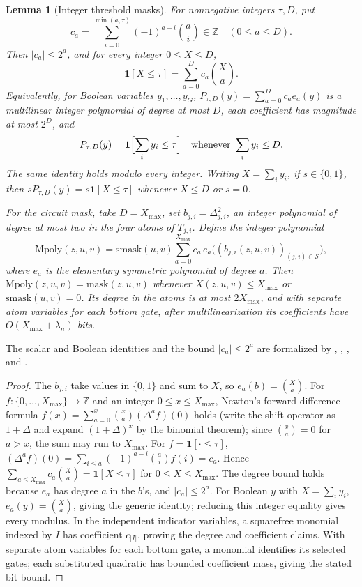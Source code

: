 \documentclass[11pt,letterpaper]{article}
\newtheorem{lemma}[theorem]{Lemma}
\theoremstyle{definition}
\theoremstyle{remark}
\newcommand{\Z}{\mathbb Z}
\newcommand{\smask}{\mathrm{smask}}
\newcommand{\mask}{\mathrm{mask}}
\newcommand{\Mpoly}{\mathrm{Mpoly}}
\newcommand{\ind}{\mathbf 1}
\newcommand{\cS}{\mathcal S}
\newcommand{\Xmax}{X_{\max}}
\begin{document}
\begin{lemma}[Integer threshold masks]\label{lem:maskpoly}
For nonnegative integers \(\tau,D\), put
\[
 c_a=\sum_{i=0}^{\min(a,\tau)}(-1)^{a-i}\binom ai\in\Z
 \quad(0\le a\le D).
\]
Then \(|c_a|\le2^a\), and for every integer \(0\le X\le D\),
\[
 \ind[X\le\tau]=\sum_{a=0}^{D}c_a\binom Xa.
\]
Equivalently, for Boolean variables \(y_1,\ldots,y_G\),
\(P_{\tau,D}(y)=\sum_{a=0}^{D}c_a e_a(y)\) is a multilinear integer polynomial of degree at most \(D\), each coefficient has magnitude at most \(2^D\), and
\[
 P_{\tau,D}(y)=\ind\Bigl[\sum_i y_i\le\tau\Bigr]
 \quad\text{whenever }\sum_i y_i\le D.
\]
The same identity holds modulo every integer. Writing \(X=\sum_i y_i\), if \(s\in\{0,1\}\), then \(sP_{\tau,D}(y)=s\ind[X\le\tau]\) whenever \(X\le D\) or \(s=0\).

For the circuit mask, take \(D=\Xmax\), set
\(b_{j,i}=\Delta_{j,i}^2\), an integer polynomial of degree at most two
in the four atoms of \(T_{j,i}\). Define the integer polynomial
\[
 \Mpoly(z,u,v)=\smask(u,v)\sum_{a=0}^{\Xmax}c_a\,e_a\bigl((b_{j,i}(z,u,v))_{(j,i)\in\cS}\bigr),
\]
where \(e_a\) is the elementary symmetric polynomial of degree \(a\).
Then \(\Mpoly(z,u,v)=\mask(z,u,v)\) whenever \(X(z,u,v)\le\Xmax\) or
\(\smask(u,v)=0\). Its degree in the atoms is at most \(2\Xmax\), and
with separate atom variables for each bottom gate, after multilinearization its coefficients have \(O(\Xmax+\lambda_n)\)
bits.
\end{lemma}
The scalar and Boolean identities and the bound \(|c_a|\le2^a\) are formalized by , , , and .

\begin{proof}
The \(b_{j,i}\) take values in \(\{0,1\}\) and sum to \(X\), so
\(e_a(b)=\binom Xa\). For \(f:\{0,\dots,\Xmax\}\to\Z\) and an integer
\(0\le x\le\Xmax\), Newton's forward-difference formula
\(f(x)=\sum_{a=0}^{x}\binom xa(\Delta^af)(0)\) holds (write the shift
operator as \(1+\Delta\) and expand \((1+\Delta)^x\) by the binomial
theorem); since \(\binom xa=0\) for \(a>x\), the sum may run to
\(\Xmax\). For \(f=\ind[\cdot\le\tau]\),
\((\Delta^af)(0)=\sum_{i\le a}(-1)^{a-i}\binom aif(i)=c_a\). Hence
\(\sum_{a\le\Xmax}c_a\binom Xa=\ind[X\le\tau]\) for \(0\le X\le\Xmax\). The
degree bound holds because \(e_a\) has degree \(a\) in the \(b\)'s, and
\(|c_a|\le2^a\).
For Boolean \(y\) with \(X=\sum_i y_i\), \(e_a(y)=\binom Xa\), giving the generic identity; reducing this integer equality gives every modulus. In the independent indicator variables, a squarefree monomial indexed by \(I\) has coefficient \(c_{|I|}\), proving the degree and coefficient claims. With separate atom variables for each bottom gate, a monomial identifies its selected gates; each substituted quadratic has bounded coefficient mass, giving the stated bit bound.
\end{proof}
\end{document}
